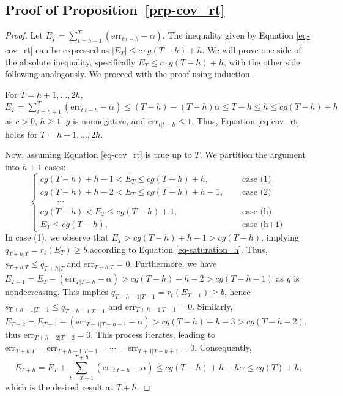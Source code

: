 \documentclass[
  11pt,
  12pt]{article}
\theoremstyle{plain}
\theoremstyle{remark}
\begin{document}
\subsection{\texorpdfstring{Proof of
Proposition~\ref{prp-cov_rt}}{Proof of Proposition~}}\label{sec-proof_cov_rt}

\begin{proof}
Let \(E_T=\sum_{t=h+1}^{T}(\mathrm{err}_{t|t-h}-\alpha)\). The
inequality given by Equation \eqref{eq-cov_rt} can be expressed as
\(|E_T| \leq c \cdot g(T-h) + h\). We will prove one side of the
absolute inequality, specifically \(E_T \leq c \cdot g(T-h) + h\), with
the other side following analogously. We proceed with the proof using
induction.

For \(T=h+1,\ldots,2h\),
\(E_T = \sum_{t=h+1}^{T}(\mathrm{err}_{t|t-h}-\alpha) \leq (T-h)-(T-h)\alpha \leq T-h \leq h \leq cg(T-h) + h\)
as \(c>0\), \(h\geq 1\), \(g\) is nonnegative, and
\(\mathrm{err}_{t|t-h} \leq 1\). Thus, Equation \eqref{eq-cov_rt} holds
for \(T=h+1,\ldots,2h\).

Now, assuming Equation \eqref{eq-cov_rt} is true up to \(T\). We
partition the argument into \(h+1\) cases: \[
\begin{cases}
cg(T-h)+h-1 < E_T \leq cg(T-h)+h, & \quad \text { case (1) } \\
cg(T-h)+h-2 < E_T \leq cg(T-h)+h-1, & \quad \text { case (2) } \\
\qquad \cdots \\
cg(T-h) < E_T \leq cg(T-h)+1, & \quad \text { case (h) } \\
E_T \leq cg(T-h). & \quad \text { case (h+1) }
\end{cases}
\] In case (1), we observe that \(E_T > cg(T-h)+h-1 > cg(T-h)\),
implying \(q_{T+h|T} = r_t(E_{T}) \geq b\) according to Equation
\eqref{eq-saturation_h}. Thus, \(s_{T+h|T} \leq q_{T+h|T}\) and
\(\mathrm{err}_{T+h|T} = 0\). Furthermore, we have
\(E_{T-1} = E_T - (\mathrm{err}_{T|T-h} - \alpha) > cg(T-h)+h-2 > cg(T-h-1)\)
as \(g\) is nondecreasing. This implies
\(q_{T+h-1|T-1} = r_t(E_{T-1}) \geq b\), hence
\(s_{T+h-1|T-1} \leq q_{T+h-1|T-1}\) and
\(\mathrm{err}_{T+h-1|T-1} = 0\). Similarly,
\(E_{T-2} = E_{T-1} - (\mathrm{err}_{T-1|T-h-1} - \alpha) > cg(T-h)+h-3 > cg(T-h-2)\),
thus \(\mathrm{err}_{T+h-2|T-2} = 0\). This process iterates, leading to
\(\mathrm{err}_{T+h|T} = \mathrm{err}_{T+h-1|T-1} = \cdots = \mathrm{err}_{T+1|T-h+1} = 0\).
Consequently, \[
E_{T+h} = E_T+\sum_{t=T+1}^{T+h}(\mathrm{err}_{t|t-h}-\alpha) \leq cg(T-h)+h-h\alpha \leq cg(T)+h,
\] which is the desired result at \(T+h\).


\end{proof}
\end{document}
